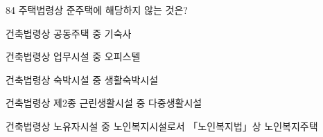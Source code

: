 \begin{question}{84}
주택법령상 준주택에 해당하지 않는 것은?
\begin{choices}
  \item 건축법령상 공동주택 중 기숙사
  \item 건축법령상 업무시설 중 오피스텔
  \item 건축법령상 숙박시설 중 생활숙박시설
  \item 건축법령상 제2종 근린생활시설 중 다중생활시설
  \item 건축법령상 노유자시설 중 노인복지시설로서 「노인복지법」상 노인복지주택
\end{choices}
\end{question}
